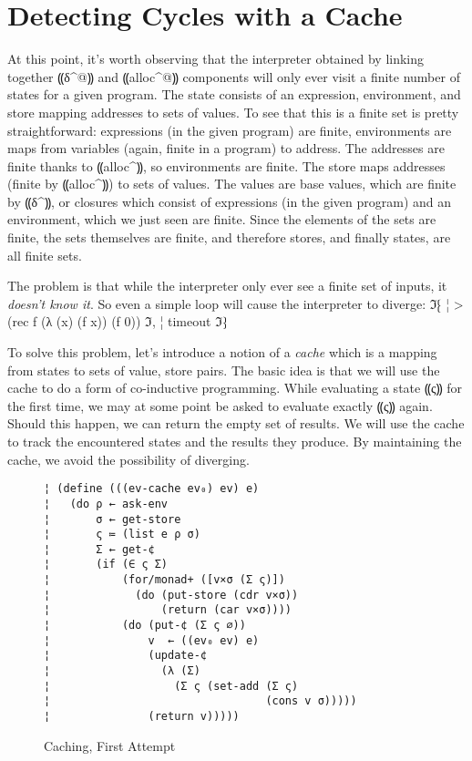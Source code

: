 \section{Detecting Cycles with a Cache}\label{s:cache}

At this point, it's worth observing that the interpreter obtained by
linking together ⸨δ^@⸩ and ⸨alloc^@⸩ components will
only ever visit a finite number of states for a given program.  The
state consists of an expression, environment, and store mapping
addresses to sets of values.  To see that this is a finite set is
pretty straightforward: expressions (in the given program) are finite,
environments are maps from variables (again, finite in a program) to
address.  The addresses are finite thanks to ⸨alloc^⸩, so
environments are finite.  The store maps addresses (finite by
⸨alloc^⸩) to sets of values.  The values are base values, which
are finite by ⸨δ^⸩, or closures which consist of expressions
(in the given program) and an environment, which we just seen are
finite.  Since the elements of the sets are finite, the sets
themselves are finite, and therefore stores, and finally states, are
all finite sets.

The problem is that while the interpreter only ever see a finite set
of inputs, it \emph{doesn't know it}.  So even a simple loop will
cause the interpreter to diverge:
ℑ⁅
¦ > (rec f (λ (x) (f x)) (f 0))
ℑ,
¦ timeout
ℑ⁆

To solve this problem, let's introduce a notion of a \emph{cache} which is a
mapping from states to sets of value, store pairs.  The basic idea is that we
will use the cache to do a form of co-inductive programming. While evaluating a
state ⸨ς⸩ for the first time, we may at some point be asked to evaluate
exactly ⸨ς⸩ again.  Should this happen, we can return the empty set of
results.  We will use the cache to track the encountered states and the results
they produce.  By maintaining the cache, we avoid the possibility of diverging.

\begin{figure}
\begin{lstlisting}
¦ (define (((ev-cache ev₀) ev) e)
¦   (do ρ ← ask-env
¦       σ ← get-store
¦       ς ≔ (list e ρ σ)
¦       Σ ← get-¢
¦       (if (∈ ς Σ)
¦           (for/monad+ ([v×σ (Σ ς)])
¦             (do (put-store (cdr v×σ))
¦                 (return (car v×σ))))
¦           (do (put-¢ (Σ ς ∅))
¦               v  ← ((ev₀ ev) e)
¦               (update-¢
¦                 (λ (Σ) 
¦                   (Σ ς (set-add (Σ ς)
¦                                 (cons v σ)))))
¦               (return v)))))
\end{lstlisting}
\caption{Caching, First Attempt}
\label{f:ev-cache0}
\end{figure}

